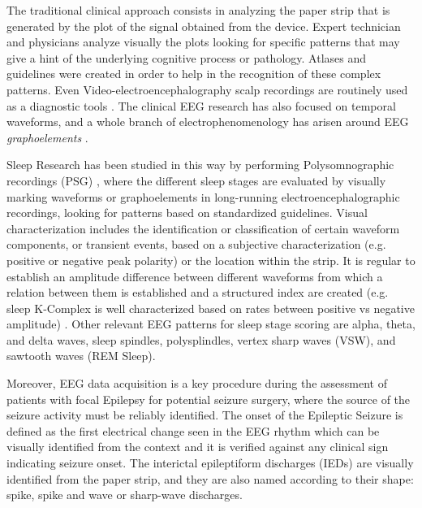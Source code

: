 \documentclass[brainsci,article,submit,moreauthors,pdftex,10pt,a4paper]{mdpi}
\begin{document}
The traditional clinical approach consists in analyzing the paper strip that is generated by the plot of the signal obtained from the device.  Expert technician and physicians analyze visually the plots looking for specific patterns that may give a hint of the underlying cognitive process or pathology.   Atlases and guidelines were created in order to help in the recognition of these complex patterns.   Even Video-electroencephalography scalp recordings are routinely used as a diagnostic tools \citep{Giagante2003} .  The clinical EEG research has also focused on temporal waveforms, and a whole branch of electrophenomenology has arisen around EEG \textit{graphoelements} \citep{Schomer2010}.  

Sleep Research has been studied in this way by performing Polysomnographic recordings (PSG)  \citep{Rodenbeck2006}, where the different sleep stages are evaluated by visually marking waveforms or graphoelements in long-running electroencephalographic recordings, looking for patterns based on standardized guidelines.   Visual characterization includes the identification or classification of certain waveform components, or transient events, based on a subjective characterization (e.g. positive or negative peak polarity) or the location within the strip.  It is regular to establish an amplitude difference between different waveforms from which a relation between them is established and a structured index are created (e.g. sleep K-Complex is well characterized based on rates between positive vs negative amplitude) \citep{Uchida1999}.  Other relevant EEG patterns for sleep stage scoring are alpha, theta, and delta waves,  sleep spindles, polysplindles, vertex sharp waves (VSW), and sawtooth waves (REM Sleep).

Moreover, EEG data acquisition is a key procedure during the assessment of patients with focal Epilepsy for potential seizure surgery, where the source of the seizure activity must be reliably identified. The onset of the Epileptic Seizure is defined as the first electrical change seen in the EEG rhythm which can be visually identified from the context and it is verified against any clinical sign indicating seizure onset.  The interictal epileptiform discharges (IEDs) are visually identified from the paper strip, and they are also named according to their shape: spike, spike and wave or sharp-wave discharges\citep{EEGIntro}.  
\end{document}
